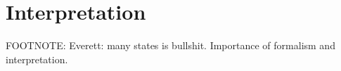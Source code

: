 \section{Interpretation}
FOOTNOTE: Everett: many states is bullshit. Importance of formalism and interpretation.
%
%
%
%
%
%
%
